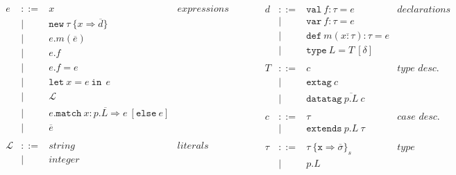 \documentclass{article}
\newcommand{\keywadj}[1]{\mathtt{#1}}
\newcommand{\keyw}[1]{\keywadj{#1}~}
\begin{document}
\[\begin{array}{lll}
\begin{array}{lllr}
e & ::= & x                                                              & expressions \\
  & |   & \keywadj{new}~\tau~\{x \Rightarrow \overline{d}\}              &\\
  & |   & e.m(\overline{e})                                              &\\
  & |   & e.f                                                            &\\
  & |   & e.f = e                                                        &\\
  & |   & \keyw{let} x=e~\keyw{in}~e                                     &\\
  & |   & \mathscr{L}                                                    &\\
  & |   & e.\keyw{match} \overline{x:p.L \Rightarrow e} ~[\keyw{else} e] &\\
  & |   & \overline{e}                                                   &\\
&&\\
\mathscr{L} & ::= & string & literals \\
& | & integer &\\
&&\\
\end{array}
& ~~~~~~
&
\begin{array}{lllr}
d & ::= & \keyw{val} f : \tau = e                    & declarations \\
  & |   & \keyw{var} f : \tau = e                    &\\
  & |   & \keyw{def} m(\overline{x:\tau}) : \tau = e &\\
  & |   & \keyw{type} L = T ~[\delta]                 &\\
&&\\
T & ::= & c                                & \textit{type desc.}\\
  & |   & \keyw{extag} c                   &\\
  & |   & \keyw{datatag} \overline{p.L} ~c &\\
&&\\
c & ::= & \tau                    & \textit{case desc.} \\
  & |   & \keyw{extends} p.L~\tau &\\
&&\\
\tau & ::= & \tau~\{\texttt{x} \Rightarrow \overline{\sigma}\}_{s} & type \\
     & |   & p.L                                                   &\\

\end{array}
\end{array}\]
\end{document}
